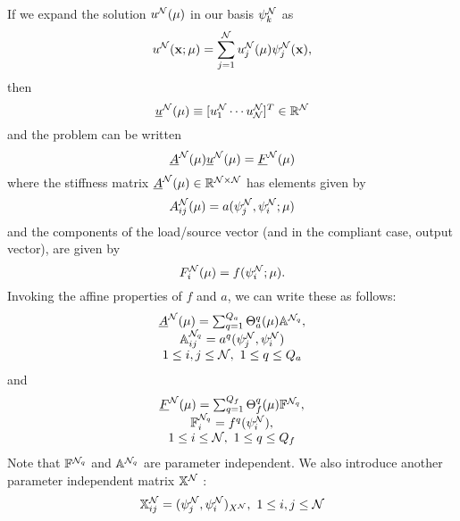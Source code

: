 If we expand the solution $u^{\mathcal{N}}({\mathbf{\mu}})$ in our basis $\psi^{\mathcal{N}}_k$ as
\begin{equation}\label{eq:FEbas}
u^{\mathcal{N}}({\mathbf{x}};{\mathbf{\mu}})=\sum^{\mathcal{N}}_{j=1}u^{\mathcal{N}}_j({\mathbf{\mu}})\psi^{\mathcal{N}}_j({\mathbf{x}}),
\end{equation}
then
\begin{equation}
\underline{u}^{\mathcal{N}}({\mathbf{\mu}})\equiv[u_1^{\mathcal{N}}\cdots u_{\mathcal{N}}^{\mathcal{N}}]^T \in \mathbb{R}^{\mathcal{N}}
\end{equation}
and the problem can be written
\begin{equation}
\underline{A}^{\mathcal{N}}({\mathbf{\mu}})\underline{u}^{\mathcal{N}}({\mathbf{\mu}})=\underline{F}^{\mathcal{N}}({\mathbf{\mu}})
\end{equation}
where the stiffness matrix $\underline{A}^{\mathcal{N}}({\mathbf{\mu}})\in \mathbb{R}^{\mathcal{N}\times \mathcal{N}}$ has elements given by
\begin{equation}
A_{ij}^{\mathcal{N}}({\mathbf{\mu}})=a(\psi_j^{\mathcal{N}},\psi_i^{\mathcal{N}}; {\mathbf{\mu}})
\end{equation}
and the components of the load/source vector (and in the compliant case, output vector), are given by
\begin{equation}
F^{\mathcal{N}}_i({\mathbf{\mu}})=f(\psi_i^{\mathcal{N}}; {\mathbf{\mu}}).
\end{equation}
Invoking the affine properties of $f$ and $a$, we can write these as follows:
\begin{equation}\begin{array}{c}
\underline{A}^{\mathcal{N}}({\mathbf{\mu}})=\sum_{q=1}^{Q_a} \Theta^q_a({\mathbf{\mu}})\mathbb{A}^{\mathcal{N}_q}, \\ 
\mathbb{A}^{\mathcal{N}_q}_{ij}=a^q(\psi^{\mathcal{N}}_j,\psi^{\mathcal{N}}_i)\\
1\leq i,j \leq \mathcal{N}, \mbox{  } 1\leq q \leq Q_a
\end{array}
\end{equation}
and 
\begin{equation}
\begin{array}{c}
\underline{F}^{\mathcal{N}}({\mathbf{\mu}})=\sum_{q=1}^{Q_f} \Theta^q_f({\mathbf{\mu}})\mathbb{F}^{\mathcal{N}_q}, \\ 
\mathbb{F}^{\mathcal{N}_q}_{i}=f^q(\psi^{\mathcal{N}}_i), \\
1\leq i \leq \mathcal{N}, \mbox{  } 1\leq q \leq Q_f
\end{array}
\end{equation}
Note that $\mathbb{F}^{\mathcal{N}_q}$ and  $\mathbb{A}^{\mathcal{N}_q}$ are parameter independent. We also introduce another parameter independent matrix $\mathbb{X}^{\mathcal{N}}$ :
\begin{equation}\label{eq:XbbMat}
\mathbb{X}^{\mathcal{N}}_{ij}=(\psi^{\mathcal{N}}_j,\psi^{\mathcal{N}}_i)_{X^{\mathcal{N}}}, \mbox{  } 1\leq i,j \leq \mathcal{N}
\end{equation}
